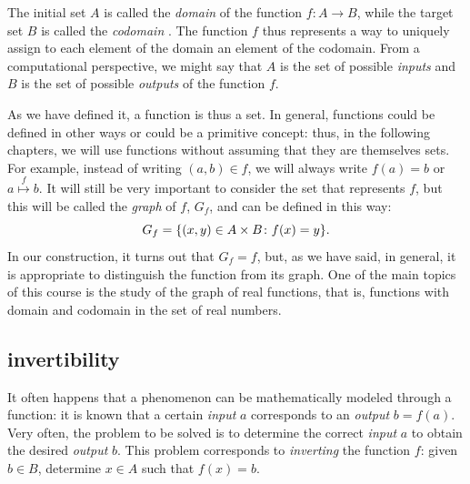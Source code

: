 The initial set $A$ is called the \emph{domain}  
of the function $f\colon A\to B$, while the target set $B$ is called the
\emph{codomain}  . The function $f$ thus
represents a way to uniquely assign to each element of the domain an element of
the codomain. From a computational perspective, we might say that $A$ is the set
of possible \emph{inputs} and $B$ is the set of possible \emph{outputs} of the
function $f$.

As we have defined it, a function is thus a set. In general, functions could be
defined in other ways or could be a primitive concept: thus, in the following
chapters, we will use functions without assuming that they are themselves sets.
For example, instead of writing $(a,b)\in f$, we will always write $f(a)=b$ or
$a\stackrel f \mapsto b$. It will still be very important to consider the set
that represents $f$, but this will be called the \emph{graph} 
 of $f$, $G_f$, and can be defined in this way:
\[
  G_f = {\left\{ (x,y)\in A \times B\colon f(x)=y \right\}}.
\]
In our construction, it turns out that $G_f = f$, but, as we have said, in
general, it is appropriate to distinguish the function from its graph. One of
the main topics of this course is the study of the graph of real functions, that
is, functions with domain and codomain in the set of real numbers.

\subsection{invertibility}

It often happens that a phenomenon can be mathematically modeled through a
function: it is known that a certain \emph{input} $a$ corresponds to an
\emph{output} $b=f(a)$. Very often, the problem to be solved is to determine the
correct \emph{input} $a$ to obtain the desired \emph{output} $b$. This problem
corresponds to \emph{inverting} the function $f$: given $b\in B$, determine
$x\in A$ such that $f(x) = b$.


